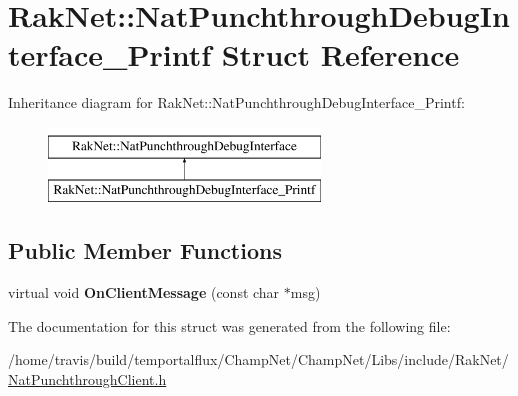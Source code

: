 \hypertarget{struct_rak_net_1_1_nat_punchthrough_debug_interface___printf}{\section{Rak\-Net\-:\-:Nat\-Punchthrough\-Debug\-Interface\-\_\-\-Printf Struct Reference}
\label{struct_rak_net_1_1_nat_punchthrough_debug_interface___printf}
}
Inheritance diagram for Rak\-Net\-:\-:Nat\-Punchthrough\-Debug\-Interface\-\_\-\-Printf\-:\begin{figure}[H]
\begin{center}
\leavevmode
\includegraphics[height=2.000000cm]{struct_rak_net_1_1_nat_punchthrough_debug_interface___printf}
\end{center}
\end{figure}
\subsection*{Public Member Functions}
\begin{DoxyCompactItemize}
\item 
\hypertarget{struct_rak_net_1_1_nat_punchthrough_debug_interface___printf_a4fc171c0c4be6514a64889daeb38c359}{virtual void {\bfseries On\-Client\-Message} (const char $\ast$msg)}\label{struct_rak_net_1_1_nat_punchthrough_debug_interface___printf_a4fc171c0c4be6514a64889daeb38c359}

\end{DoxyCompactItemize}


The documentation for this struct was generated from the following file\-:\begin{DoxyCompactItemize}
\item 
/home/travis/build/temportalflux/\-Champ\-Net/\-Champ\-Net/\-Libs/include/\-Rak\-Net/\hyperlink{_nat_punchthrough_client_8h}{Nat\-Punchthrough\-Client.\-h}\end{DoxyCompactItemize}
